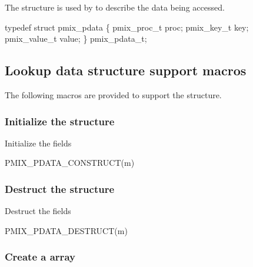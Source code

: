 The  structure is used by  to describe the data being accessed.

\cspecificstart
\begin{codepar}
typedef struct pmix_pdata \{
    pmix_proc_t proc;
    pmix_key_t key;
    pmix_value_t value;
\} pmix_pdata_t;
\end{codepar}
\cspecificend

\subsection{Lookup data structure support macros}

The following macros are provided to support the  structure.

\subsubsection{Initialize the  structure}

Initialize the  fields

\cspecificstart
\begin{codepar}
PMIX_PDATA_CONSTRUCT(m)
\end{codepar}
\cspecificend

\begin{arglist}
\end{arglist}

\subsubsection{Destruct the  structure}

Destruct the  fields

\cspecificstart
\begin{codepar}
PMIX_PDATA_DESTRUCT(m)
\end{codepar}
\cspecificend

\begin{arglist}
\end{arglist}

\subsubsection{Create a  array}

